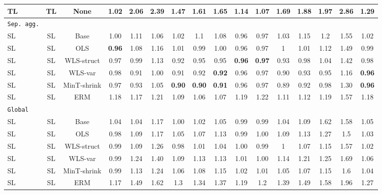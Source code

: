 \documentclass[preprint, 3p, times, twocolumn]{elsarticle}
\begin{document}
\begin{table}
\begin{center}
{\begin{tabular}{l c  cccccccccccccc}
      \hspace{0.1cm} 	TL	&TL	&None	&1.02	&2.06	&2.39	&1.47	&1.61	&1.65	&1.14	&1.07	&1.69	&1.88	&1.97	&2.86	&1.29	\\
      \midrule																	
      \texttt{Sep. agg.}																	\\
      \hspace{0.1cm} 	SL	&SL	&Base	&1.00	&1.11	&1.06	&1.02	&1.1	&1.08	&0.96	&0.97	&1.03	&1.15	&1.2	&1.55	&1.02	\\
      \hspace{0.1cm} 	SL	&SL	&OLS	&\textbf{0.96}	&1.08	&1.16	&1.01	&0.99	&1.00	&0.96	&0.97	&1	&1.01	&1.12	&1.49	&0.99	\\
      \hspace{0.1cm} 	SL	&SL	&WLS-struct	&0.97	&0.99	&1.13	&0.92	&0.95	&0.95	&\textbf{0.96}	&\textbf{0.97}	&0.93	&0.98	&1.04	&1.42	&0.98	\\
      \hspace{0.1cm} 	SL	&SL	&WLS-var	&0.98	&0.91	&1.00	&0.91	&0.92	&\textbf{0.92}	&0.96	&0.97	&0.90	&0.93	&0.95	&1.16	&\textbf{0.96}	\\
      \hspace{0.1cm} 	SL	&SL	&MinT-shrink	&0.97	&0.93	&1.05	&\textbf{0.90}	&\textbf{0.90}	&\textbf{0.91}	&0.96	&0.97	&0.89	&0.92	&0.98	&1.30	&\textbf{0.96}	\\
      \hspace{0.1cm} 	SL	&SL	&ERM	&1.18	&1.17	&1.21	&1.09	&1.06	&1.07	&1.19	&1.22	&1.11	&1.12	&1.19	&1.57	&1.18	\\
      \midrule																	
      \texttt{Global}																	\\
      \hspace{0.1cm} 	SL	&SL	&Base	&1.04	&1.04	&1.17	&1.00	&1.02	&1.05	&0.99	&0.99	&1.04	&1.09	&1.62	&1.58	&1.05	\\
      \hspace{0.1cm} 	SL	&SL	&OLS	&0.98	&1.09	&1.17	&1.05	&1.07	&1.13	&0.99	&1.00	&1.09	&1.13	&1.27	&1.5	&1.03	\\
      \hspace{0.1cm} 	SL	&SL	&WLS-struct	&0.99	&1.09	&1.26	&0.98	&1.01	&1.04	&1.00	&0.99	&1	&1.07	&1.15	&1.57	&1.02	\\
      \hspace{0.1cm} 	SL	&SL	&WLS-var	&0.99	&1.24	&1.40	&1.09	&1.13	&1.13	&1.01	&1.00	&1.14	&1.21	&1.25	&1.69	&1.06	\\
      \hspace{0.1cm} 	SL	&SL	&MinT-shrink	&0.99	&1.13	&1.24	&1.06	&1.08	&1.15	&1.02	&1.01	&1.05	&1.07	&1.15	&1.6	&1.04	\\
      \hspace{0.1cm} 	SL	&SL	&ERM	&1.17	&1.49	&1.62	&1.3	&1.34	&1.37	&1.19	&1.2	&1.39	&1.49	&1.58	&1.96	&1.27	\\
      \bottomrule
      \end{tabular}}
      \end{center}
      \end{table}
          
\end{document}
